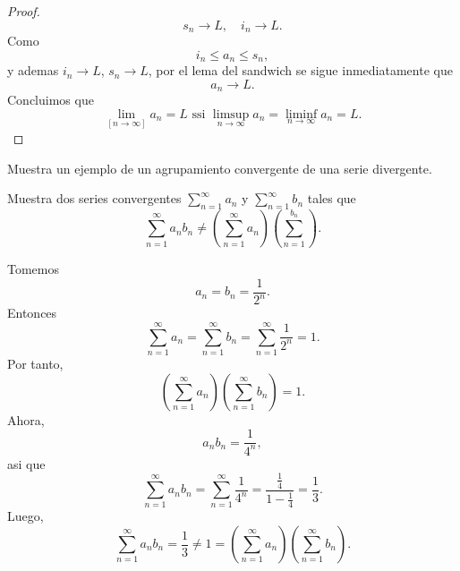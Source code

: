 \documentclass[12pt,a4paper]{article}
\newcommand{\paren}[1]{\left( #1 \right)}
\begin{document}
\begin{proof}
\begin{equation*}
            s_{n}\to L,\quad i_{n}\to L.
        \end{equation*}
        Como 
        \begin{equation*}
            i_{n}\leq a_{n}\leq s_{n},
        \end{equation*}
        y ademas $i_{n}\to L$, $s_{n}\to L$, por el lema del sandwich se sigue inmediatamente que
        \begin{equation*}
            a_{n}\to L.
        \end{equation*}
        Concluimos que
        \begin{equation*}
            \lim_[n\to\infty]a_{n}=L\text{ ssi }\limsup_{n\to\infty}a_{n}=\liminf_{n\to\infty}a_{n}=L.
        \end{equation*}
    \end{proof}

    \begin{mdframed}[style=mdpinkbox,frametitle={Ejercicio 2}]
        Muestra un ejemplo de un agrupamiento convergente de una serie divergente.
    \end{mdframed}

    \begin{mdframed}[style=mdpinkbox,frametitle={Ejercicio 3}]
        Muestra dos series convergentes $\sum_{n=1}^{\infty}a_{n}$ y $\sum_{n=1}^{\infty}b_{n}$ tales que
        \begin{equation*}
            \sum_{n=1}^{\infty}a_{n}b_{n}\neq\paren{\sum_{n=1}^{\infty}a_{n}}\paren{\sum_{n=1}^{b_{n}}}.
        \end{equation*}
    \end{mdframed}

    \begin{solucion}
        Tomemos
        \begin{equation*}
            a_{n}=b_{n}=\frac{1}{2^{n}}.
        \end{equation*}
        Entonces
        \begin{equation*}
            \sum_{n=1}^{\infty}a_{n}=\sum_{n=1}^{\infty}b_{n}=\sum_{n=1}^{\infty}\frac{1}{2^{n}}=1.
        \end{equation*}
        Por tanto,
        \begin{equation*}
            \paren{\sum_{n=1}^{\infty}a_{n}}\paren{\sum_{n=1}^{\infty}b_{n}}=1.
        \end{equation*}
        Ahora,
        \begin{equation*}
            a_{n}b_{n}=\frac{1}{4^{n}},
        \end{equation*}
        asi que
        \begin{equation*}
            \sum_{n=1}^{\infty}a_{n}b_{n}=\sum_{n=1}^{\infty}\frac{1}{4^{n}}=\frac{\frac{1}{4}}{1-\frac{1}{4}}=\frac{1}{3}.
        \end{equation*}
        Luego,
        \begin{equation*}
            \sum_{n=1}^{\infty}a_{n}b_{n}=\frac{1}{3}\neq1=\paren{\sum_{n=1}^{\infty}a_{n}}\paren{\sum_{n=1}^{\infty}b_{n}}.
        \end{equation*}
    \end{solucion}
\end{document}
